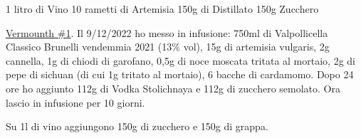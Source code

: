 \serves{-}%
\cooktime[]{-}%
\begin{ingreds}
	1 litro di Vino
	10 rametti di Artemisia
	150g di Distillato
	150g Zucchero



\end{ingreds}


\begin{method}
\underline{Vermounth \#1}. Il 9/12/2022 ho messo in infusione: 750ml di Valpollicella Classico Brunelli vendemmia 2021 (13\% vol), 15g di artemisia vulgaris, 2g cannella, 1g di chiodi di garofano, 0,5g di noce moscata tritata al mortaio, 2g di pepe di sichuan (di cui 1g tritato al mortaio), 6 bacche di cardamomo. Dopo 24 ore ho aggiunto 112g di Vodka Stolichnaya e 112g di zucchero semolato. Ora lascio in infusione per 10 giorni.

Su 1l di vino aggiungono 150g di zucchero e 150g di grappa.


\end{method}




